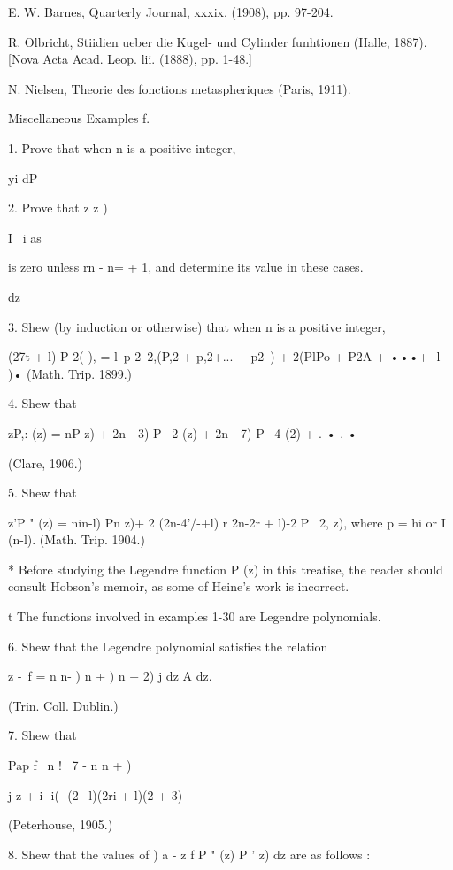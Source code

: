 {{{{E. W. Barnes, Quarterly Journal, xxxix. (1908), pp. 97-204.

R. Olbricht, Stiidien ueber die Kugel- und Cylinder funhtionen (Halle,
1887). [Nova Acta Acad. Leop. lii. (1888), pp. 1-48.]

N. Nielsen, Theorie des fonctions metaspheriques (Paris, 1911).

Miscellaneous Examples f.

1. Prove that when n is a positive integer,


yi dP

2. Prove that z z )

I \ i as

is zero unless rn - n= + 1, and determine its value in these cases.

dz


3. Shew (by induction or otherwise) that when n is a positive integer,

(27t + l) P 2( ), = l\ p 2\ 2,(P,2 + p,2+... + p2 \,) + 2(PlPo + P2A
+ •••+ -l )• (Math. Trip. 1899.)

4. Shew that

zP,: (z) = nP z) + 2n - 3) P \ 2 (z) + 2n - 7) P \ 4 (2) + . • . •

(Clare, 1906.)

5. Shew that

z'P " (z) = nin-l) Pn z)+ 2 (2n-4'/-+l) r 2n-2r + l)-2 P \ 2, z),
where p = hi or I (n-l). (Math. Trip. 1904.)

* Before studying the Legendre function P (z) in this treatise, the
reader should consult Hobson's memoir, as some of Heine's work is
incorrect.

t The functions involved in examples 1-30 are Legendre polynomials.

%
%

6. Shew that the Legendre polynomial satisfies the relation

 z -\ f = n n- ) n + ) n + 2) j dz A dz.

(Trin. Coll. Dublin.)

7. Shew that

Pap f \ n ! \ 7 - n n + ) \

j z + i -i( -(2 \ l)(2ri + l)(2 + 3)-

(Peterhouse, 1905.)

8. Shew that the values of ) a - z f P " (z) P ' z) dz are as follows
:

}}}}
